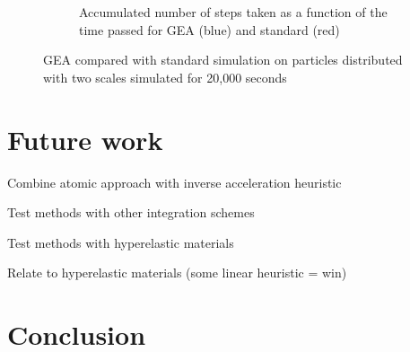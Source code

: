 \documentclass[11pt]{article}
\begin{document}
\begin{figure}
\begin{subfigure}[t]{0.5\textwidth}
        \caption{Accumulated number of steps taken as a function of the time passed for GEA
        (blue) and standard (red)}
        \label{fig:inverse_multiscale_cumstep}
    \end{subfigure}
    \caption{GEA compared with standard simulation on particles distributed with
        two scales simulated for 20,000 seconds}
    \label{fig:inverse_multiscale}
\end{figure}

%


\section{Future work}

Combine atomic approach with inverse acceleration heuristic

Test methods with other integration schemes

Test methods with hyperelastic materials

Relate to hyperelastic materials (some linear heuristic = win)


\section{Conclusion}







\end{document}
